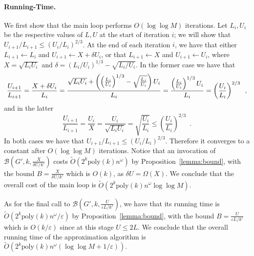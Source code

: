 \documentclass{llncs}
\newcommand{\poly}{\mathrm{poly}}
\begin{document}
\paragraph{Running-Time.} 
We first show that the main loop performs $O(\log\log M)$ iterations. Let $L_i,U_i$ be the respective values of $L,U$ at the start of iteration $i$; we will show that $U_{i+1}/L_{i+1} \leq (U_{i}/L_{i})^{2/3}$. At the end of each iteration $i$, we have that either $L_{i+1}\gets L_i$ and $U_{i+1}\gets X+\delta U_i$, or that $L_{i+1}\gets X$ and $U_{i+1}\gets U_i$, where $X=\sqrt{L_iU_i}$ and $\delta = (L_i/U_i)^{1/3}-\sqrt{L_i/U_i}$. In the former case we have that 
\begin{equation}
\frac{U_{i+1}}{L_{i+1}}=\frac{X+\delta U_i}{L_i}=\frac{\sqrt{L_iU_i} + \left(\left(\frac{L_i}{U_i}\right)^{1/3}-\sqrt{\frac{L_i}{U_i}}\right)U_i}{L_i} \\ =\frac{\left(\frac{L_i}{U_i}\right)^{1/3}U_i}{L_i}=\left(\frac{U_i}{L_i}\right)^{2/3}\enspace,
\end{equation}
and in the latter
\begin{equation}
\frac{U_{i+1}}{L_{i+1}}=\frac{U_i}{X}=\frac{U_i}{\sqrt{L_iU_i}}=\sqrt{\frac{U_i}{L_i}} \leq \left(\frac{U_i}{L_i}\right)^{2/3}\enspace.
\end{equation}
In both cases we have that $U_{i+1}/L_{i+1} \leq (U_{i}/L_{i})^{2/3}$. Therefore it converges to a constant after $O(\log\log M)$ iterations. Notice that an invocation of $\mathcal{B}(G', k,  \frac{X}{\delta U/k'})$ costs $\tilde{O}(2^k \poly(k) n^\omega)$ by Proposition~\ref{lemma:bound}, with the bound $B=  \frac{X}{\delta U/k'}$ which is $O(k)$, as $\delta U = \Omega(X)$. We conclude that the overall cost of the main loop is $\tilde{O}(2^k \poly(k) n^\omega \log\log M)$.

As for the final call to $\mathcal{B}(G',k,  \frac{U}{\varepsilon L/k'})$, we have that its running time is $\tilde{O}(2^k \poly(k) n^\omega /\varepsilon)$ by Proposition~\ref{lemma:bound}, with the bound $B=  \frac{U}{\varepsilon L/k'}$ which is $O(k/\varepsilon)$ since at this stage $U \leq 2L$. We conclude that the overall running time of the approximation algorithm is $\tilde{O}(2^k \poly(k) n^\omega(\log\log M + 1/\varepsilon))$.
\end{document}
